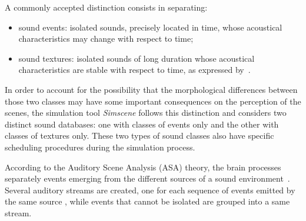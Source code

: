 \documentclass[12pt]{elsarticle}
\newcommand{\ie}{\emph{i.\,e.}}
\begin{document}
 A commonly accepted distinction consists in separating:

\begin{itemize}
\item {sound events}: isolated sounds, precisely located in time, whose acoustical characteristics may change with respect to time;
\item {sound textures}: isolated sounds of long duration whose acoustical characteristics are stable with respect to time, as expressed by~\cite{saint1995classification}.
\end{itemize}



In order to account for the possibility that the morphological differences between those two classes may have some important consequences on the perception of the scenes, the simulation tool \emph{Simscene} follows this distinction and considers two distinct sound databases: one with classes of events only and the other with classes of textures only. These two types of sound classes also have specific scheduling procedures during the simulation process.


According to the Auditory Scene Analysis (ASA) theory, the brain processes separately events emerging from the different sources of a sound environment~\cite{bregman1994auditory}. Several auditory streams are created, one for each sequence of events emitted by the same source \cite{carlyon2004brain}, while events that cannot be isolated are grouped into a same stream.

\end{document}
